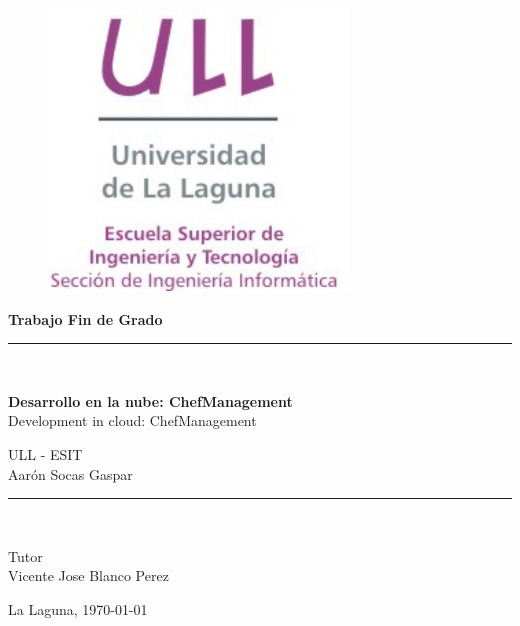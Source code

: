\documentclass[spanish,a4paper,twoside]{report}
\begin{document}
\begin{titlepage}

  \begin{center}
    \vspace*{-1in}
    \begin{figure}[htb]
      \begin{center}
        \includegraphics[width=8cm]{./images/logotipo-secundario-ULL-ESIT.jpg}
      \end{center}
    \end{figure}

    \begin{Large}
      \textbf{{\huge Trabajo Fin de Grado}}
    \end{Large}
    \rule{80mm}{0.3mm}\\
  \end{center}

  \begin{center}
    \vspace*{0.2in}
    \begin{LARGE}
      \textbf{Desarrollo en la nube: ChefManagement} \\
      Development in cloud: ChefManagement \\
    \end{LARGE}

    \vspace*{0.2in}
    \begin{large}
      ULL - ESIT\\
      {Aarón Socas Gaspar}\\
    \end{large}
    \vspace*{0.3in}
    \rule{80mm}{0.1mm}\\
    
    \vspace*{0.1in}
    \begin{large}
      Tutor \\
      Vicente Jose Blanco Perez \\
    \end{large}
    \vspace*{0.3in}
    \Large La Laguna, \today \\
  \end{center}

\end{titlepage}
\end{document}

